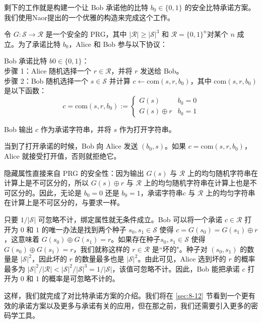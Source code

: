 \begin{snote}[来自安全PRG的比特承诺。]
剩下的工作就是构建一个让 Bob 承诺他的比特 $b_0\in\{0,1\}$ 的安全比特承诺方案。我们使用Naor提出的一个优雅的构造来完成这个工作。

令 $G:\mathcal{S}\to\mathcal{R}$ 是一个安全的 PRG，其中 $|\mathcal{R}|\geq|\mathcal{S}|^3$ 和 $\mathcal{R}=\{0,1\}^n$对某个 $n$ 成立。为了承诺比特 $b_0$，Alice 和 Bob 参与以下协议：

\vspace*{5pt}

\hspace*{5pt} Bob 承诺比特 $b0\in\{0,1\}$：\\
\hspace*{50pt} 步骤 1：Alice 随机选择一个 $r\in\mathcal{R}$，并将 $r$ 发送给 Bob。\\
\hspace*{50pt} 步骤 2：Bob 随机选择一个 $s\in\mathcal{S}$ 并计算 $c\leftarrow\mathrm{com}(s,r,b_0)$，其中 $\mathrm{com}(s,r,b_0)$ 是以下函数：\\
\[
c=\mathrm{com}(s,r,b_0):=
\left\{
\begin{array}{ll}
G(s) & b_0=0\\
G(s)\oplus r & b_0=1
\end{array}	
\right.
\]

\hspace*{5pt} Bob 输出 $c$ 作为承诺字符串，并将 $s$ 作为打开字符串。

\vspace*{5pt}

\noindent
当到了打开承诺的时候，Bob 向 Alice 发送 $(b_0,s)$。如果 $c=\mathrm{com}(s,r,b_0)$，Alice 就接受打开值，否则就拒绝它。

隐藏属性直接来自 PRG 的安全性：因为输出 $G(s)$ 与 $\mathcal{R}$ 上的均匀随机字符串在计算上是不可区分的，所以 $G(s)\oplus r$ 与 $\mathcal{R}$ 上的均匀随机字符串在计算上也是不可区分的。因此，无论是 $b_0=0$ 还是 $b_0=1$，承诺字符串$c$ 与 $\mathcal{R}$ 上的均匀字符串在计算上是不可区分的，与要求一样。

只要 $1/|\mathcal{S}|$ 可忽略不计，绑定属性就无条件成立。Bob 可以将一个承诺 $c\in\mathcal{R}$ 打开为 $0$ 和 $1$ 的唯一办法是找到两个种子 $s_0,s_1\in\mathcal{S}$ 使得 $c=G(s_0)=G(s_1)\oplus r$，这意味着 $G(s_0)\oplus G(s_1)=r$。如果存在种子$s_0,s_1\in\mathcal{S}$ 使得 $G(s_0)\oplus G(s_1)=r$，我们就称这样的 $r\in\mathcal{R}$ 是``坏的"。种子对 $(s_0,s_1)$ 的数量是 $|\mathcal{S}|^2$，因此坏的 $r$ 的数量最多也是 $|\mathcal{S}|^2$。由此可见，Alice 选到坏的 $r$ 的概率最多为 $|\mathcal{S}|^2/|\mathcal{R}| < |\mathcal{S}|^2/|\mathcal{S}|^3 = 1/|\mathcal{S}|$，该值可忽略不计。因此，Bob 能把承诺 $c$ 打开为 $0$ 和 $1$ 的概率是可忽略不计的。
\end{snote}

这样，我们就完成了对比特承诺方案的介绍。我们将在 \ref{sec:8-12} 节看到一个更有效的承诺方案以及更多与承诺有关的应用，但在那之前，我们还需要引入更多的密码学工具。